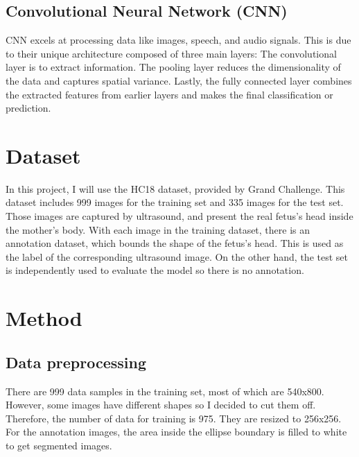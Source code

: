 \documentclass[conference]{article}
\begin{document}
\subsection{Convolutional Neural Network (CNN)} CNN excels at processing data like images, speech, and audio signals. This is due to their unique architecture composed of three main layers: The convolutional layer is to extract information. The pooling layer reduces the dimensionality of the data and captures spatial variance. Lastly, the fully connected layer combines the extracted features from earlier layers and makes the final classification or prediction.

\section{Dataset}
In this project, I will use the HC18 dataset, provided by Grand Challenge. This dataset includes 999 images for the training set and 335 images for the test set. Those images are captured by ultrasound, and present the real fetus's head inside the mother's body. With each image in the training dataset, there is an annotation dataset, which bounds the shape of the fetus's head. This is used as the label of the corresponding ultrasound image. On the other hand, the test set is independently used to evaluate the model so there is no annotation.\\

\section{Method}
\subsection{Data preprocessing} There are 999 data samples in the training set, most of which are 540x800. However, some images have different shapes so I decided to cut them off. Therefore, the number of data for training is 975. They are resized to 256x256.\\
For the annotation images, the area inside the ellipse boundary is filled to white to get segmented images.
\end{document}
